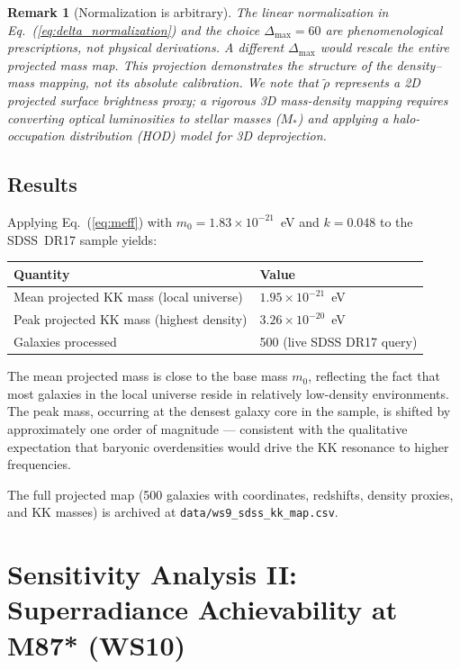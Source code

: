 \documentclass[12pt]{article}
\newtheorem{remark}{Remark}
\begin{document}
\begin{remark}[Normalization is arbitrary]
\label{rem:ws9_normalization}
The linear normalization in Eq.~(\ref{eq:delta_normalization}) and the choice $\Delta_{\max} = 60$ are phenomenological prescriptions, not physical derivations.
A different $\Delta_{\max}$ would rescale the entire projected mass map.
This projection demonstrates the \emph{structure} of the density--mass mapping, not its absolute calibration.
We note that $\tilde{\rho}$ represents a 2D projected surface brightness proxy; a rigorous 3D mass-density mapping requires converting optical luminosities to stellar masses ($M_*$) and applying a halo-occupation distribution (HOD) model for 3D deprojection.
\end{remark}

\subsection{Results}

Applying Eq.~(\ref{eq:meff}) with $m_0 = 1.83 \times 10^{-21}$~eV and $k = 0.048$ to the SDSS~DR17 sample yields:
\begin{center}
\begin{tabular}{ll}
\toprule
\textbf{Quantity} & \textbf{Value} \\
\midrule
Mean projected KK mass (local universe) & $1.95 \times 10^{-21}$~eV \\
Peak projected KK mass (highest density) & $3.26 \times 10^{-20}$~eV \\
Galaxies processed & 500 (live SDSS DR17 query) \\
\bottomrule
\end{tabular}
\end{center}
The mean projected mass is close to the base mass $m_0$, reflecting the fact that most galaxies in the local universe reside in relatively low-density environments.
The peak mass, occurring at the densest galaxy core in the sample, is shifted by approximately one order of magnitude --- consistent with the qualitative expectation that baryonic overdensities would drive the KK resonance to higher frequencies.

The full projected map (500 galaxies with coordinates, redshifts, density proxies, and KK masses) is archived at \texttt{data/ws9\_sdss\_kk\_map.csv}.

\section{Sensitivity Analysis II: Superradiance Achievability at M87* (WS10)}
\label{sec:ws10}
\end{document}
